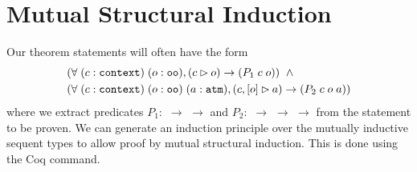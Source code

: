 \section{Mutual Structural Induction}
\label{sec:induction}

%
%
Our theorem statements will often have the form
\begin{align*}
(\forall \; (c : \sltm{context}) & \; (o : \sltm{oo}), (\seqsl[c]{o}) \rightarrow (P_1 \; c \; o)) \;\; \wedge \\
(\forall \; (c : \sltm{context}) & \; (o : \sltm{oo}) \; (a : \sltm{atm}), (\bchsl[c]{o}{a}) \rightarrow (P_2 \; c \; o \; a))
\end{align*}
where we extract predicates $P_1 :$  $\rightarrow$  $\rightarrow$  and $P_2 :$  $\rightarrow$  $\rightarrow$  $\rightarrow$  from the statement to be proven. We can generate an induction principle over the mutually inductive sequent types to allow proof by mutual structural induction. This is done using the Coq  command.


